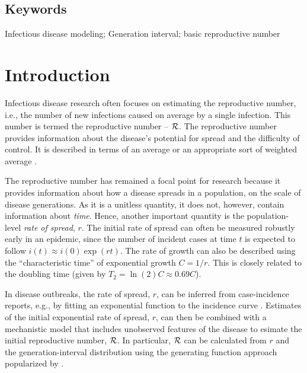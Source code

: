\documentclass[12pt]{article}
\newcommand{\RR}{\ensuremath{{\cal R}}}
\newcommand{\Tc}{\ensuremath{C}}
\begin{document}
\subsection*{Keywords}

Infectious disease modeling; Generation interval; basic reproductive number


\section{Introduction}

Infectious disease research often focuses on estimating the reproductive number, i.e., the number of new infections caused on average by a single infection.
This number is termed the reproductive number -- \RR.
The reproductive number provides information about the disease's potential for spread and the difficulty of control.
It is described in terms of an average \cite{AndeMay91} or an appropriate sort of weighted average \cite{DiekHees90}.

The reproductive number has remained a focal point for research because it provides information about how a disease spreads in a population, on the scale of disease generations.
As it is a unitless quantity, it does not, however, contain information about \emph{time}.
Hence, another important quantity is the population-level \emph{rate of spread}, $r$. The initial rate of spread can often be measured robustly 
early in an epidemic, since the number of incident cases at time $t$ is expected to follow $i(t) \approx i(0) \exp(r t)$. The rate of growth can also be described using the ``characteristic time'' of exponential growth $\Tc = 1/r$. This is closely related to the doubling time (given by $T_2 = \ln(2) \Tc \approx 0.69 \Tc$).

In disease outbreaks, the rate of spread, $r$, can be inferred from case-incidence reports, e.g., by fitting an exponential function to the incidence curve \cite{MillRobi04, NishCast09, MaJDush14}.
Estimates of the initial exponential rate of spread, $r$, can then be combined with a mechanistic model that includes unobserved features of the disease to esimate the initial reproductive number, \RR.
In particular, $\RR$ can be calculated from $r$ and the generation-interval distribution using the generating function approach popularized by \cite{WallLips07}.
\end{document}

